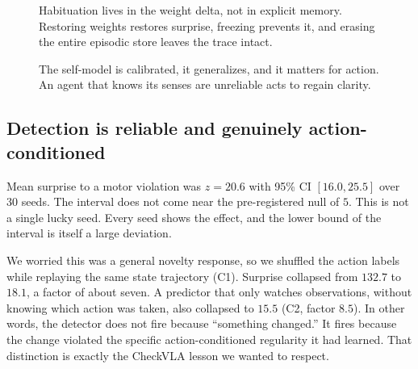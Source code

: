 \documentclass[11pt,a4paper]{article}
\begin{document}
\begin{figure}[h]
\centering
{}
\caption{Habituation lives in the weight delta, not in explicit memory. Restoring weights restores surprise, freezing prevents it, and erasing the entire episodic store leaves the trace intact.}
\label{fig:hab}
\end{figure}

\begin{figure}[h]
\centering
{}
\caption{The self-model is calibrated, it generalizes, and it matters for action. An agent that knows its senses are unreliable acts to regain clarity.}
\label{fig:phi}
\end{figure}

\subsection{Detection is reliable and genuinely action-conditioned}

Mean surprise to a motor violation was $z=20.6$ with 95\% CI $[16.0, 25.5]$ over 30 seeds. The interval does not come near the pre-registered null of $5$. This is not a single lucky seed. Every seed shows the effect, and the lower bound of the interval is itself a large deviation.

We worried this was a general novelty response, so we shuffled the action labels while replaying the same state trajectory (C1). Surprise collapsed from $132.7$ to $18.1$, a factor of about seven. A predictor that only watches observations, without knowing which action was taken, also collapsed to $15.5$ (C2, factor $8.5$). In other words, the detector does not fire because ``something changed.'' It fires because the change violated the specific action-conditioned regularity it had learned. That distinction is exactly the CheckVLA lesson we wanted to respect.
\end{document}

